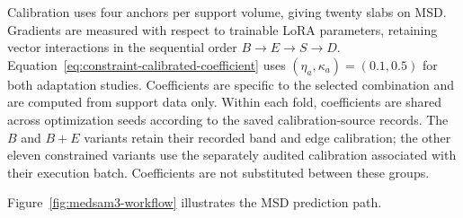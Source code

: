\documentclass[12pt,a4paper]{article}
\begin{document}
Calibration uses four anchors per support volume, giving twenty slabs
on MSD. Gradients are measured with respect to trainable
LoRA parameters, retaining vector interactions in the sequential order
$B\to E\to S\to D$. Equation~\ref{eq:constraint-calibrated-coefficient}
uses $(\eta_a,\kappa_a)=(0.1,0.5)$ for both adaptation studies. Coefficients
are specific to the selected combination and are computed from support
data only. Within each fold, coefficients are shared across optimization
seeds according to the saved calibration-source records. The $B$ and
$B+E$ variants retain their recorded band and edge calibration; the
other eleven constrained variants use the separately audited calibration
associated with their execution batch. Coefficients are not substituted
between these groups.

Figure~\ref{fig:medsam3-workflow} illustrates the MSD prediction path.
\end{document}
